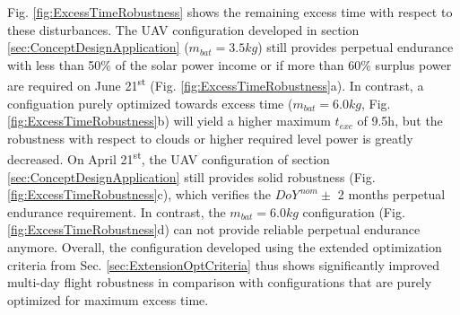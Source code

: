 Fig. \ref{fig:ExcessTimeRobustness} shows the remaining excess time with respect to these disturbances. The UAV configuration developed in section \ref{sec:ConceptDesignApplication} ($m_{bat}=3.5kg$) still provides perpetual endurance with less than 50\% of the solar power income or if more than 60\% surplus power are required on June 21\textsuperscript{st} (Fig. \ref{fig:ExcessTimeRobustness}a). In contrast, a configuation purely optimized towards excess time ($m_{bat}=6.0kg$, Fig. \ref{fig:ExcessTimeRobustness}b) will yield a higher maximum $t_{exc}$ of 9.5h, but the robustness with respect to clouds or higher required level power is greatly decreased. On April  21\textsuperscript{st}, the UAV configuration of section \ref{sec:ConceptDesignApplication} still provides solid robustness (Fig. \ref{fig:ExcessTimeRobustness}c), which verifies the $DoY^{\,nom}\pm$ 2 months perpetual endurance requirement. In contrast, the $m_{bat}=6.0kg$ configuration (Fig. \ref{fig:ExcessTimeRobustness}d) can not provide reliable perpetual endurance anymore. Overall, the configuration developed using the extended optimization criteria from Sec. \ref{sec:ExtensionOptCriteria} thus shows significantly improved multi-day flight robustness in comparison with configurations that are purely optimized for maximum excess time.